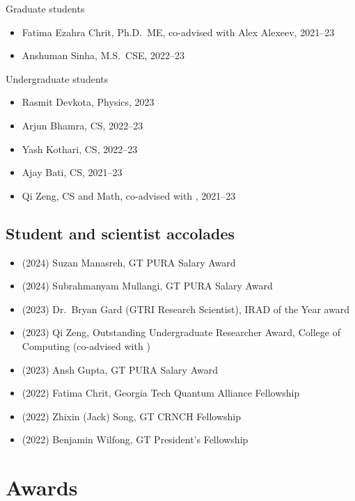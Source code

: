 Graduate students
\begin{itemize}
    \item Fatima Ezahra Chrit, Ph.D.\ ME, co-advised with Alex Alexeev, 2021--23
    \item Anshuman Sinha, M.S.\ CSE, 2022--23
\end{itemize}

Undergraduate students
\begin{itemize}
    \item Rasmit Devkota, Physics, 2023
    \item Arjun Bhamra, CS, 2022--23
    \item Yash Kothari, CS, 2022--23
    \item Ajay Bati, CS, 2021--23
    \item Qi Zeng, CS and Math, co-advised with \Florian, 2021--23
\end{itemize}

\subsection{Student and scientist accolades}

\begin{itemize}
    \item (2024) Suzan Manasreh, GT PURA Salary Award
    \item (2024) Subrahmanyam Mullangi, GT PURA Salary Award
    \item (2023) Dr.\ Bryan Gard (GTRI Research Scientist), IRAD of the Year award
    \item (2023) Qi Zeng, Outstanding Undergraduate Researcher Award, College of Computing (co-advised with \Florian)
    \item (2023) Ansh Gupta, GT PURA Salary Award
    \item (2022) Fatima Chrit, Georgia Tech Quantum Alliance Fellowship
    \item (2022) Zhixin (Jack) Song, GT CRNCH Fellowship
    \item (2022) Benjamin Wilfong, GT President's Fellowship
\end{itemize}

\section{Awards}

